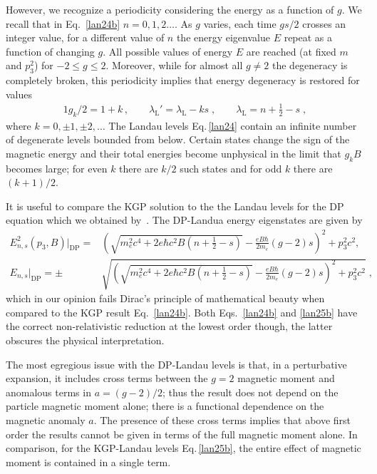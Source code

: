 However, we recognize a periodicity considering the energy as a function of $g$. We recall that in Eq.~\eqref{lan24b} $n=0, 1, 2\ldots$. As $g$ varies, each time $gs/2$ crosses an integer value, for a different value of $n$ the energy eigenvalue $E$ repeat as a function of changing $g$. All possible values of energy $E$ are reached (at fixed $m$ and $p^2_3$) for $-2\le g\le 2$. Moreover, while for almost all $g\ne 2$ the degeneracy is completely broken, this periodicity implies that energy degeneracy is restored for values~\cite{Evans:2022ygl,Evans:2022fsu} 
\begin{alignat}{1}
\label{lan26}
g_{k}/2=1+k\,,\qquad
\lambda_\mathrm{L}'=\lambda_\mathrm{L}-ks\;,\qquad
\lambda_\mathrm{L}=n+\frac{1}{2}-s\;,
\end{alignat}
where $k=0,\pm1,\pm2,\ldots$ The Landau levels Eq.\,\eqref{lan24} contain an infinite number of degenerate levels bounded from below. Certain states change the sign of the magnetic energy and their total energies become unphysical in the limit that $g_{k}B$ becomes large; for even $k$ there are $k/2$ such states and for odd $k$ there are $(k+1)/2$.

It is useful to compare the KGP solution to the the Landau levels for the DP equation which we obtained by~\cite{Tsai:1971zma}. The DP-Landua energy eigenstates are given by
\begin{subequations}
\begin{alignat}{1}
\label{lan25} 
E^{2}_{n,s}(p_{3},B)|_\mathrm{DP} =&\left(\!\!\sqrt{\displaystyle m_{e}^{2}c^{4}\!+\!2e\hbar c^{2}B\left(n+\frac{1}{2}-s\right)}-\frac{eB\hbar}{2m_{e}}(g-2)s\!\right)^{2}\!\!\!+p_{3}^{\!\!2}c^{2},\\[0.4cm]
\label{lan25b}
E_{n,s}|_\mathrm{DP} =\pm &\sqrt{\!\left(\!\!\sqrt{\displaystyle m_{e}^{2}c^{4}+2e\hbar c^{2}B\left(n+\frac{1}{2}-s\right)}\!-\!\frac{eB\hbar}{2m_{e}}(g-2)s\!\right)^{\!\!2}\!\!\!+p_{3}^{2}c^{2}}\;,
\end{alignat}
\end{subequations}
which in our opinion fails Dirac's principle of mathematical beauty when compared to the KGP result Eq.~\eqref{lan24b}. Both Eqs.~\eqref{lan24b} and \eqref{lan25b} have the correct non-relativistic reduction at the lowest order though, the latter obscures the physical interpretation.

The most egregious issue with the DP-Landau levels is that, in a perturbative expansion, it includes cross terms between the $g\!=\!2$ magnetic moment and anomalous terms in $a=(g-2)/2$; thus the result does not depend on the particle magnetic moment alone; there is a functional dependence on the magnetic anomaly $a$. The presence of these cross terms implies that above first order the results cannot be given in terms of the full magnetic moment alone. In comparison, for the KGP-Landau levels Eq.\,\eqref{lan25b}, the entire effect of magnetic moment is contained in a single term.

